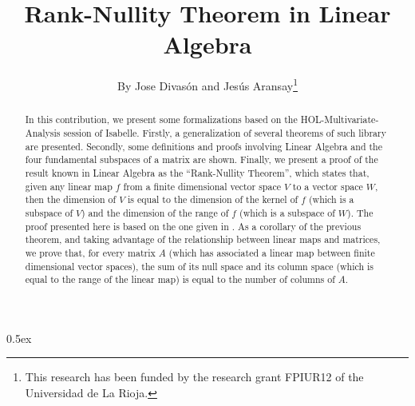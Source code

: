 \documentclass[11pt,a4paper]{article}
\begin{document}
\title{Rank-Nullity Theorem in Linear Algebra}
\author{By Jose Divas\'on and Jes\'us Aransay\thanks{This research has been funded 
  by the research grant FPIUR12 of the Universidad de La Rioja.}}
\maketitle

\begin{abstract}
In this contribution, we present some formalizations based on the HOL-Multivariate-Analysis session of Isabelle. 
Firstly, a generalization of several theorems of such library are presented. Secondly, some definitions 
and proofs involving Linear Algebra and the four fundamental subspaces of a matrix are shown.
Finally, we present a proof of the result known in Linear Algebra as the ``Rank-Nullity Theorem'', 
which states that, given any linear map $f$ from a finite dimensional vector space $V$ to a vector space $W$, 
then the dimension of $V$ is equal to the dimension of the kernel of $f$ (which is a subspace of $V$) and the 
dimension of the range of $f$ (which is a subspace of $W$). The proof presented here is based on the 
one given in \cite{AX97}. As a corollary of the previous theorem, 
and taking advantage of the relationship between linear maps and matrices, we prove that, for every matrix $A$ 
(which has associated a linear map between finite dimensional vector spaces), 
the sum of its null space and its column space (which is equal to the range of the linear map) is equal to 
the number of columns of $A$.
\end{abstract}

\tableofcontents

\parindent 0pt\parskip 0.5ex





\end{document}
